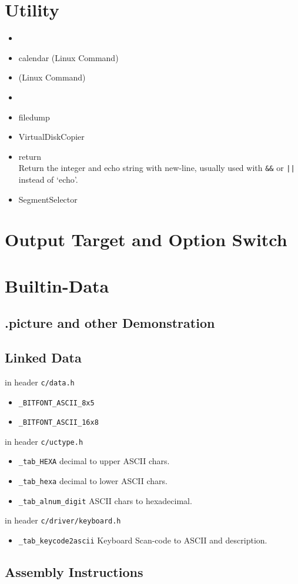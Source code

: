 \section{Utility}

\begin{itemize}
\item {}
\item {}    calendar (Linux Command)
\item {}  (Linux Command)
\item {}
\item {}  filedump
\item {}  VirtualDiskCopier
\item {}    return \\
	Return the integer and echo string with new-line, usually used with \verb`&&` or \verb `||` instead of `echo'.
\item {} SegmentSelector
\end{itemize}

\section{Output Target and Option Switch}


\section{Builtin-Data}

\subsection{.picture and other Demonstration}

\subsection{Linked Data}

in header \verb`c/data.h`
\begin{itemize}
	\item \verb `_BITFONT_ASCII_8x5`
	\item \verb `_BITFONT_ASCII_16x8`
\end{itemize}

in header \verb`c/uctype.h`
\begin{itemize}
	\item \verb `_tab_HEXA` decimal to upper ASCII chars.
	\item \verb `_tab_hexa` decimal to lower ASCII chars.
	\item \verb `_tab_alnum_digit` ASCII chars to hexadecimal.
\end{itemize}

in header \verb`c/driver/keyboard.h`
\begin{itemize}
	\item \verb `_tab_keycode2ascii` Keyboard Scan-code to ASCII and description.
\end{itemize}

\subsection{Assembly Instructions}


